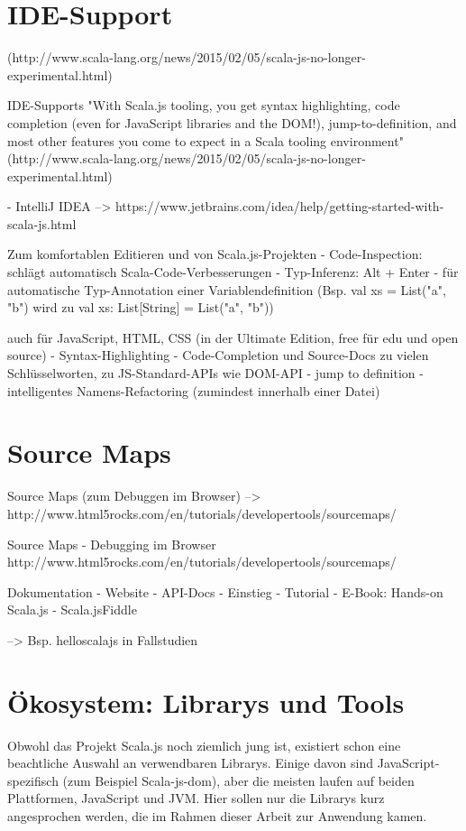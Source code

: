 \documentclass[a4paper, 12pt, hidelinks, listof=totoc, listoftables=totoc, bibliography=totoc]{scrreprt}
\begin{document}
\section{IDE-Support}
(http://www.scala-lang.org/news/2015/02/05/scala-js-no-longer-experimental.html)

IDE-Supports
  "With Scala.js tooling, you get syntax highlighting, code completion (even for JavaScript libraries and the DOM!), jump-to-definition, and most other features you come to expect in a Scala tooling environment" (http://www.scala-lang.org/news/2015/02/05/scala-js-no-longer-experimental.html)

  - IntelliJ IDEA  -->  https://www.jetbrains.com/idea/help/getting-started-with-scala-js.html

    Zum komfortablen Editieren und von Scala.js-Projekten
    - Code-Inspection: schlägt automatisch Scala-Code-Verbesserungen
    - Typ-Inferenz: Alt + Enter - für automatische Typ-Annotation einer Variablendefinition (Bsp. val xs = List("a", "b") wird zu val xs: List[String] = List("a", "b"))

    auch für JavaScript, HTML, CSS (in der Ultimate Edition, free für edu und open source)
      - Syntax-Highlighting
      - Code-Completion und Source-Docs zu vielen Schlüsselworten, zu JS-Standard-APIs wie DOM-API
      - jump to definition
      - intelligentes Namens-Refactoring (zumindest innerhalb einer Datei)


\section{Source Maps}

Source Maps (zum Debuggen im Browser)  -->  http://www.html5rocks.com/en/tutorials/developertools/sourcemaps/

Source Maps
  - Debugging im Browser
  http://www.html5rocks.com/en/tutorials/developertools/sourcemaps/

Dokumentation
  - Website
  - API-Docs
  - Einstieg
    - Tutorial
    - E-Book: Hands-on Scala.js
    - Scala.jsFiddle

--> Bsp. helloscalajs in Fallstudien






\section{Ökosystem: Librarys und Tools}\label{sec:sjs-libs}

Obwohl das Projekt Scala.js noch ziemlich jung ist, existiert schon eine beachtliche Auswahl an verwendbaren Librarys. Einige davon sind JavaScript-spezifisch (zum Beispiel Scala-js-dom), aber die meisten laufen auf beiden Plattformen, JavaScript und \ac{JVM}. Hier sollen nur die Librarys kurz angesprochen werden, die im Rahmen dieser Arbeit zur Anwendung kamen.
\end{document}
